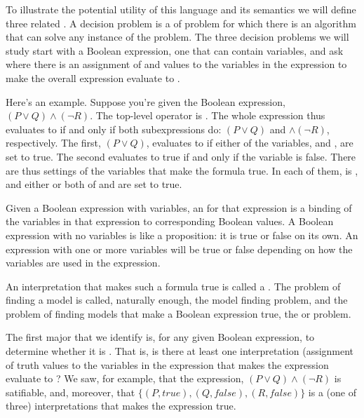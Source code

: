 \documentclass[letterpaper,10pt,english]{sphinxmanual}
\begin{document}
To illustrate the potential utility of this language and its semantics
we will define three related . A decision problem
is a  of problem for which there is an algorithm that can solve
any instance of the problem. The three decision problems we will study
start with a Boolean expression, one that can contain variables, and
ask where there is an assignment of  and  values to the
variables in the expression to make the overall expression evaluate to
.

Here’s an example. Suppose you’re given the Boolean expression,
\((P \lor Q) \land (\lnot R)\). The top-level operator is
. The whole expression thus evaluates to  if and only if
both subexpressions do: \((P \lor Q)\) and \(\land (\lnot
R)\), respectively. The first, \((P \lor Q)\), evaluates to 
if either of the variables,  and , are set to true. The second
evaluates to true if and only if the variable  is false. There are
thus settings of the variables that make the formula true. In each of
them,  is , and either or both of  and  are set to
true.

Given a Boolean expression with variables, an  for
that expression is a binding of the variables in that expression to
corresponding Boolean values. A Boolean expression with no variables
is like a proposition: it is true or false on its own. An expression
with one or more variables will be true or false depending on how the
variables are used in the expression.

An interpretation that makes such a formula true is called a .
The problem of finding a model is called, naturally enough, the model
finding problem, and the problem of finding  models that make a
Boolean expression true, the  or 
problem.

The first major  that we identify is, for any given
Boolean expression, to determine whether it is . That is,
is there at least one interpretation (assignment of truth values to
the variables in the expression that makes the expression evaluate to
?  We saw, for example, that the expression, \((P \lor Q)
\land (\lnot R)\) is satifiable, and, moreover, that \(\{ (P,
true), (Q, false), (R, false) \}\) is a (one of three) interpretations
that makes the expression true.
\end{document}
